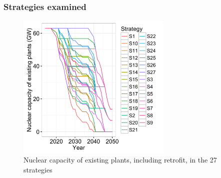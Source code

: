 \subsubsection{Strategies examined}
\label{sec:strategies_examined}

\begin{figure}[!ht]
	\centering
	\includegraphics[height=7cm]{figures/strategies.png}
	\caption{Nuclear capacity of existing plants, including retrofit, in the 27 strategies}
	\label{fig:strategies}
\end{figure}

\clearpage

